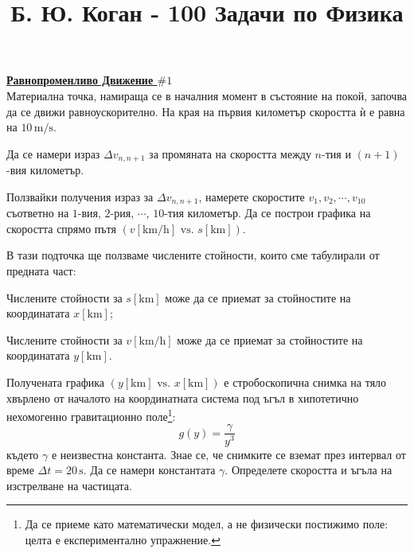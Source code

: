\documentclass[a4paper]{article}
\title{\Huge Б. Ю. Коган - 100 Задачи по Физика}
\author{}
\date{}
\begin{document}
	\maketitle
	
	\ProblemBG %
	\textbf{\underline{Равнопроменливо Движение $\# 1$}}
	\vspace{0.2em}
	\\
	Материална точка, намираща се в началния момент в състояние на покой, започва да се движи равноускорително. На края на първия километър скоростта ѝ е равна на $10\,\mathrm{m/s}$.
	\begin{description}[leftmargin=!, labelwidth=\widthof{$\bullet$}]
		\item[$\bullet$] Да се намери израз $\Delta v_{n, n+1}$ за промяната на скоростта между $n$-тия и $(n+1)$-вия километър.
		\item[$\bullet$] Ползвайки получения израз за $\Delta v_{n, n+1}$, намерете скоростите $v_1, v_2, \cdots, v_{10}$ съответно на $1$-вия, $2$-рия, $\cdots$, $10$-тия километър. Да се построи графика на скоростта спрямо пътя $(v[\mathrm{km/h}]\,\,\text{vs.}\,\,s[\mathrm{km}])$.
		\item[$\bullet$] В тази подточка ще ползваме числените стойности, които сме табулирали от предната част:
		\begin{description}[leftmargin=!, labelwidth=\widthof{$\rightarrow$}]
			\item[$\rightarrow$] Числените стойности за $s[\mathrm{km}]$ може да се приемат за стойностите на координатата $x[\mathrm{km}]$;
			\item[$\rightarrow$] Числените стойности за $v[\mathrm{km/h}]$ може да се приемат за стойностите на координатата $y[\mathrm{km}]$.
		\end{description}
		Получената графика $(y[\mathrm{km}]\,\,\text{vs.}\,\,x[\mathrm{km}])$ е стробоскопична снимка на тяло хвърлено от началото на координатната система под ъгъл в хипотетично нехомогенно гравитационно поле\footnote{Да се приеме като математически модел, а не физически постижимо поле: целта е експериментално упражнение.}:
		\begin{equation*}
			g(y) = \frac{\gamma}{y^3}
		\end{equation*} 
		където $\gamma$ е неизвестна константа. Знае се, че снимките се вземат през интервал от време $\Delta t = 20\,\mathrm{s}$.
		Да се намери константата $\gamma$. Определете скоростта и ъгъла на изстрелване на частицата.
	\end{description}
	
\end{document}
